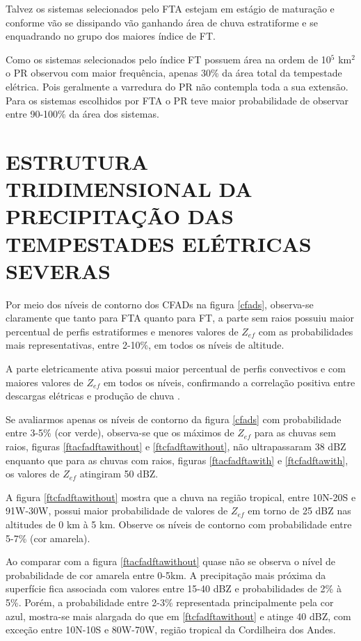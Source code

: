 Talvez os sistemas selecionados pelo FTA estejam em estágio de maturação e conforme vão se dissipando vão ganhando área de chuva estratiforme e se enquadrando no grupo dos maiores índice de FT. 

Como os sistemas selecionados pelo índice FT possuem área na ordem de 10$^5$ km$^2$ o PR observou com maior frequência, apenas  30\% da área total da tempestade elétrica. Pois geralmente a varredura do PR não contempla toda a sua extensão. Para os sistemas escolhidos por FTA o PR teve maior probabilidade de observar entre 90-100\% da área dos sistemas.


\section{ESTRUTURA TRIDIMENSIONAL DA PRECIPITAÇÃO DAS TEMPESTADES ELÉTRICAS SEVERAS}


Por meio dos níveis de contorno dos CFADs na figura \ref{cfads}, observa-se claramente que tanto para FTA quanto para FT, a parte sem raios possuiu maior percentual de perfis estratiformes e menores valores de $Z_{ef}$ com as  probabilidades mais representativas, entre 2-10\%, em todos os níveis de altitude.

A parte eletricamente ativa possui maior percentual de perfis convectivos e com maiores valores de $Z_{ef}$ em todos os níveis, confirmando a correlação positiva entre descargas elétricas e produção de chuva \cite{Petersen1998}.

Se avaliarmos apenas os níveis de contorno da figura \ref{cfads} com probabilidade entre 3-5\% (cor verde), observa-se que os máximos de $Z_{ef}$ para as chuvas sem raios, figuras \ref{ftacfadftawithout} e \ref{ftcfadftawithout}, não ultrapassaram 38 dBZ enquanto que para as chuvas com raios, figuras \ref{ftacfadftawith} e \ref{ftcfadftawith}, os valores de $Z_{ef}$ atingiram 50 dBZ.

A figura \ref{ftcfadftawithout} mostra que a chuva na região tropical, entre 10N-20S e 91W-30W, possui maior probabilidade de valores de $Z_{ef}$ em torno de 25 dBZ nas altitudes de  0 km à 5 km. Observe os níveis de contorno com probabilidade entre 5-7\% (cor amarela).

Ao comparar com a figura \ref{ftacfadftawithout} quase não se observa o nível de probabilidade de cor amarela entre 0-5km. A precipitação mais próxima da superfície fica associada com valores entre 15-40 dBZ e probabilidades de 2\% à 5\%. Porém, a probabilidade entre 2-3\% representada principalmente pela cor azul, mostra-se mais alargada do que em \ref{ftcfadftawithout} e atinge 40 dBZ, com exceção entre 10N-10S e 80W-70W, região tropical da Cordilheira dos Andes.

